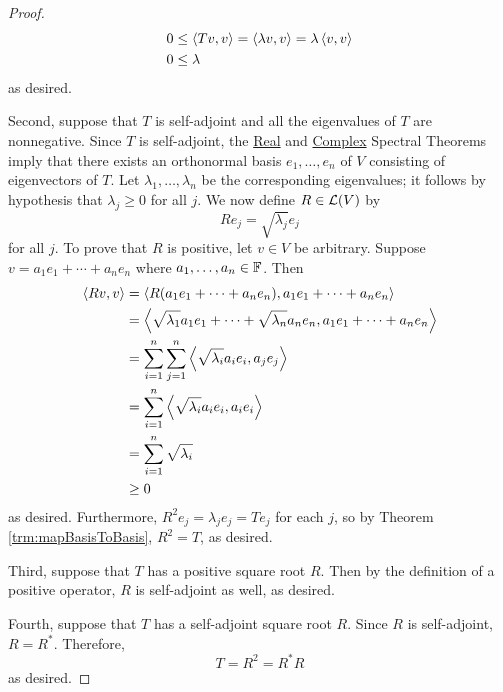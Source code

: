 \documentclass[../main.tex]{subfiles}
\begin{document}
\begin{itemize}
\begin{theorem}
\begin{proof}
            \begin{align*}
                0 &\leq \left\langle{Tv},{v}\right\rangle = \left\langle{\lambda v},{v}\right\rangle = \lambda\left\langle{v},{v}\right\rangle\\
                0 &\leq \lambda
            \end{align*}
            as desired.\par
            Second, suppose that $T$ is self-adjoint and all the eigenvalues of $T$ are nonnegative. Since $T$ is self-adjoint, the \hyperref[trm:RealSpectral]{Real} and \hyperref[trm:ComplexSpectral]{Complex} Spectral Theorems imply that there exists an orthonormal basis $e_1,\dots,e_n$ of $V$ consisting of eigenvectors of $T$. Let $\lambda_1,\dots,\lambda_n$ be the corresponding eigenvalues; it follows by hypothesis that $\lambda_j\geq 0$ for all $j$. We now define $R\in\mathcal{L}(V)$ by
            \begin{equation*}
                Re_j = \sqrt{\lambda_j}e_j
            \end{equation*}
            for all $j$. To prove that $R$ is positive, let $v\in V$ be arbitrary. Suppose $v=a_1e_1+\cdots+a_ne_n$ where $a_1,\dots,a_n\in\mathbb{F}$. Then
            \begin{align*}
                \left\langle{Rv},{v}\right\rangle &= \left\langle{R(a_1e_1+\cdots+a_ne_n)},{a_1e_1+\cdots+a_ne_n}\right\rangle\\
                &= \left\langle{\sqrt{\lambda_1}a_1e_1+\cdots+\sqrt{\lambda_n}a_ne_n},{a_1e_1+\cdots+a_ne_n}\right\rangle\\
                &= \sum_{i=1}^n\sum_{j=1}^n\left\langle{\sqrt{\lambda_i}a_ie_i},{a_je_j}\right\rangle\\
                &= \sum_{i=1}^n\left\langle{\sqrt{\lambda_i}a_ie_i},{a_ie_i}\right\rangle\\
                &= \sum_{i=1}^n\sqrt{\lambda_i}\\
                &\geq 0
            \end{align*}
            as desired. Furthermore, $R^2e_j=\lambda_je_j=Te_j$ for each $j$, so by Theorem \ref{trm:mapBasisToBasis}, $R^2=T$, as desired.\par
            Third, suppose that $T$ has a positive square root $R$. Then by the definition of a positive operator, $R$ is self-adjoint as well, as desired.\par
            Fourth, suppose that $T$ has a self-adjoint square root $R$. Since $R$ is self-adjoint, $R=R^*$. Therefore,
            \begin{equation*}
                T = R^2 = R^*R
            \end{equation*}
            as desired.\par

\end{proof}
\end{theorem}
\end{itemize}
\end{document}
